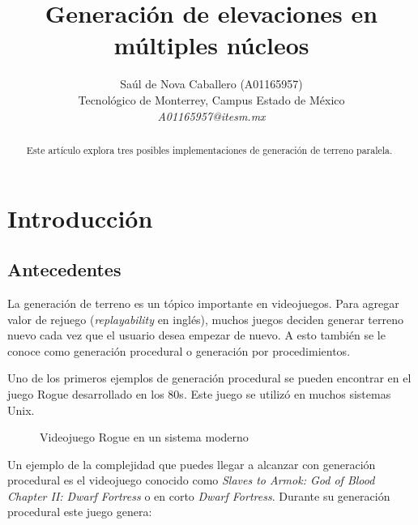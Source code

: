\documentclass[10pt,letterpaper,oneside]{article}
\begin{document}
\renewcommand\abstractname{Resumen}
\renewcommand\refname{Referencias}
\renewcommand{\notesname}{Notas}


\newcommand\crule[3][black]{\textcolor{#1}{\rule{#2}{#3}}}

\title{Generación de elevaciones en múltiples núcleos}
\author{
\Large Saúl de Nova Caballero (A01165957)
\\
Tecnológico de Monterrey, Campus Estado de México
\\  
\Large \textit{A01165957@itesm.mx}}  

\maketitle

\begin{abstract}
Este artículo explora tres posibles implementaciones de generación de terreno paralela.
\end{abstract}

\section{Introducción}

\subsection{Antecedentes}

La generación de terreno es un tópico importante en videojuegos. Para agregar valor de rejuego (\textit{replayability} en inglés), muchos juegos deciden generar terreno nuevo cada vez que el usuario desea empezar de nuevo. A esto también se le conoce como generación procedural o generación por procedimientos.

Uno de los primeros ejemplos de generación procedural se pueden encontrar en el juego Rogue desarrollado en los 80s. Este juego se utilizó en muchos sistemas Unix.

\begin{figure}[H]
	\centering
	\caption{Videojuego Rogue en un sistema moderno}
	\label{fig:rogue}	
\end{figure}

Un ejemplo de la complejidad que puedes llegar a alcanzar con generación procedural es el videojuego conocido como \textit{Slaves to Armok: God of Blood Chapter II: Dwarf Fortress} o en corto \textit{Dwarf Fortress}. Durante su generación procedural este juego genera:
\end{document}
